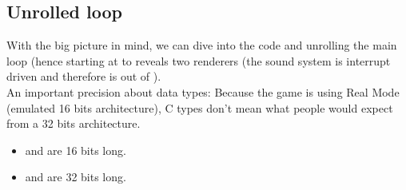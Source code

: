 \documentclass[book.tex]{subfiles}
\begin{document}
\subsection{Unrolled loop}
With the big picture in mind, we can dive into the code and unrolling the main loop (hence starting at  to reveals two renderers (the sound system is interrupt driven and therefore is out of ).\\ An important precision about data types: Because the game is using Real Mode (emulated 16 bits architecture), C types don't mean what people would expect from a 32 bits architecture.\\
\par 
\begin{itemize}
\item {} and  are 16 bits long.
\item {} and  are 32 bits long.
\end{itemize}

\par
\begin{minipage}{\textwidth}

\end{minipage}
\par
\end{document}
